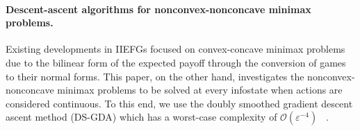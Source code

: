 \paragraph{Descent-ascent algorithms for nonconvex-nonconcave minimax problems.} Existing developments in IIEFGs focused on convex-concave minimax problems due to the bilinear form of the expected payoff through the conversion of games to their normal forms. This paper, on the other hand, investigates the nonconvex-nonconcave minimax problems to be solved at every infostate when actions are considered continuous. To this end, we use the doubly smoothed gradient descent ascent method (DS-GDA) which has a worst-case complexity of $\mathcal{O}(\varepsilon^{-4})$
~\citep{zheng2023universal}.